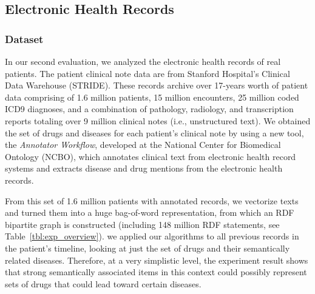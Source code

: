 \subsection{Electronic Health Records}
\subsubsection{Dataset}
In our second evaluation, we analyzed the electronic health records of real patients. The patient clinical note data are from Stanford Hospital's Clinical Data Warehouse (STRIDE). These records archive over 17-years worth of patient data comprising of 1.6 million patients, 15 million encounters, 25 million coded ICD9 diagnoses, and a combination of pathology, radiology, and transcription reports totaling over 9 million clinical notes (i.e., unstructured text).
We obtained the set of drugs and diseases for each patient's clinical note by using a new tool, the \emph{Annotator Workflow}, developed at the National Center for Biomedical Ontology (NCBO), which annotates clinical text from electronic health record systems and extracts disease and drug mentions from the electronic health records.


From this set of 1.6 million patients with annotated records, we vectorize texts and turned them into a huge bag-of-word representation, from which an RDF bipartite graph is constructed (including 148 million RDF statements, see Table~\ref{tbl:exp_overview}). we applied our algorithms to all previous records in the patient's timeline, looking at just the set of drugs and their semantically related diseases.  Therefore, at a very simplistic level, the experiment result shows that strong semantically associated items in this context could possibly represent sets of drugs that could lead toward certain diseases.

